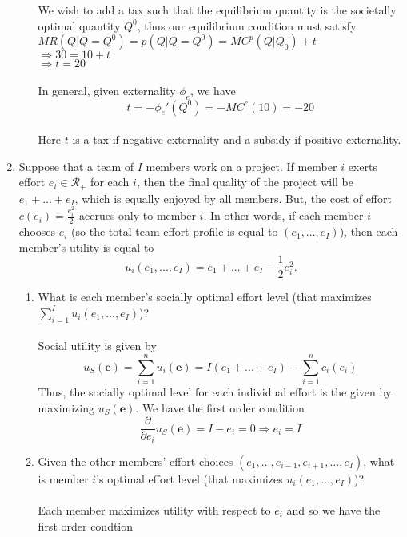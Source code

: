 \documentclass[11pt]{article}
\begin{document}
\begin{enumerate}
\begin{enumerate}
	We wish to add a tax such that the equilibrium quantity is the societally optimal quantity $Q^0$, thus our equilibrium condition must satisfy\\
	$MR(Q|Q=Q^0)=p(Q|Q=Q^0)=MC^p(Q|Q_0)+t$\\
	$\Rightarrow 30=10+t$\\
	$\Rightarrow t=20$\\\\
	In general, given externality $\phi_e$, we have\\
	$$t=-\phi_e'(Q^0)=-MC^e(10)=-20$$\\
	Here $t$ is a tax if negative externality and a subsidy if positive externality.
	\end{enumerate}
\pagebreak
\item Suppose that a team of $I$ members work on a project. If member $i$ exerts effort $e_{i}\in\mathcal{R}_{+}$ for each $i$, then the final quality of the project will be $e_{1}+...+e_{I}$, which is equally enjoyed by all members. But, the cost of effort $c(e_{i})=\frac{e_{i}^{2}}{2}$ accrues only to member $i$. In other words, if each member $i$ chooses $e_{i}$ (so the total team effort profile is equal to $(e_{1},...,e_{I})$), then each member's utility is equal to
    \begin{equation*}
    u_{i}(e_{1},...,e_{I})=e_{1}+...+e_{I}-\frac{1}{2}e_{i}^{2}.
    \end{equation*}
    \begin{enumerate}
    \item What is each member's socially optimal effort level (that maximizes $\sum_{i=1}^{I}u_{i}(e_{1},...,e_{I})$)?
    \smallskip\\\\
    Social utility is given by\\
    $$u_S(\textbf{e})=\sum_{i=1}^nu_i(\textbf{e})=I(e_1+...+e_I)-\sum_{i=1}^nc_i(e_i)$$
    Thus, the socially optimal level for each individual effort is the given by maximizing $u_S(\textbf{e})$.  We have the first order condition\\
    $$\dfrac{\partial}{\partial e_i}u_S(\textbf{e})=I-e_i=0\Rightarrow e_i=I$$
    \item Given the other members' effort choices $(e_{1},...,e_{i-1},e_{i+1},...,e_{I})$, what is member $i$'s optimal effort level (that maximizes $u_{i}(e_{1},...,e_{I})$)?
    \smallskip\\\\
    Each member maximizes utility with respect to $e_i$ and so we have the first order condtion\\

\end{enumerate}
\end{enumerate}
\end{document}
